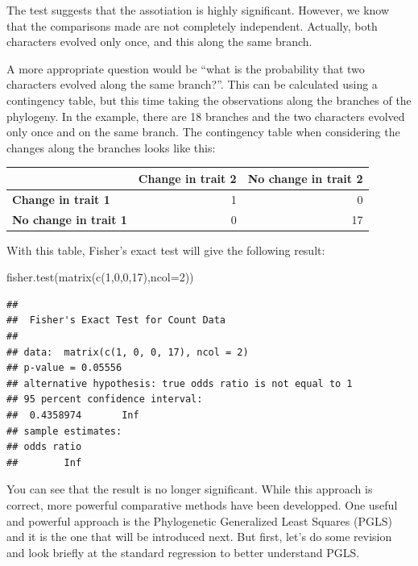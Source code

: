 \documentclass[
]{book}
\newenvironment{Shaded}{\begin{snugshade}}{\end{snugshade}}
\newcommand{\AttributeTok}[1]{\textcolor[rgb]{0.77,0.63,0.00}{#1}}
\newcommand{\DecValTok}[1]{\textcolor[rgb]{0.00,0.00,0.81}{#1}}
\newcommand{\FunctionTok}[1]{\textcolor[rgb]{0.00,0.00,0.00}{#1}}
\newcommand{\NormalTok}[1]{#1}
\begin{document}
The test suggests that the assotiation is highly significant. However, we know that the comparisons made are not completely independent. Actually, both characters evolved only once, and this along the same branch.

A more appropriate question would be ``what is the probability that two characters evolved along the same branch?''. This can be calculated using a contingency table, but this time taking the observations along the branches of the phylogeny. In the example, there are 18 branches and the two characters evolved only once and on the same branch. The contingency table when considering the changes along the branches looks like this:

\begin{tabular}{>{}l|r|r}
\hline
  & Change in trait 2 & No change in trait 2\\
\hline
\textbf{Change in trait 1} & 1 & 0\\
\hline
\textbf{No change in trait 1} & 0 & 17\\
\hline
\end{tabular}

With this table, Fisher's exact test will give the following result:

\begin{Shaded}
\begin{Highlighting}[]
\FunctionTok{fisher.test}\NormalTok{(}\FunctionTok{matrix}\NormalTok{(}\FunctionTok{c}\NormalTok{(}\DecValTok{1}\NormalTok{,}\DecValTok{0}\NormalTok{,}\DecValTok{0}\NormalTok{,}\DecValTok{17}\NormalTok{),}\AttributeTok{ncol=}\DecValTok{2}\NormalTok{))}
\end{Highlighting}
\end{Shaded}

\begin{verbatim}
## 
##  Fisher's Exact Test for Count Data
## 
## data:  matrix(c(1, 0, 0, 17), ncol = 2)
## p-value = 0.05556
## alternative hypothesis: true odds ratio is not equal to 1
## 95 percent confidence interval:
##  0.4358974       Inf
## sample estimates:
## odds ratio 
##        Inf
\end{verbatim}

You can see that the result is no longer significant. While this approach is correct, more powerful comparative methods have been developped. One useful and powerful approach is the Phylogenetic Generalized Least Squares (PGLS) and it is the one that will be introduced next. But first, let's do some revision and look briefly at the standard regression to better understand PGLS.

  
\end{document}
